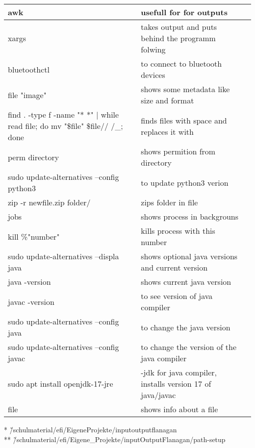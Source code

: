 \documentclass[12pt]{article}
\begin{document}
\begin{tabular}{| p{6.5cm} | p{6.5cm} | p{6.5cm} |}
    \hline
    awk & usefull for for outputs \\
    \hline 
    xargs & takes output and puts behind the programm folwing \\
    \hline
    bluetoothctl & to connect to bluetooth devices \\
    \hline
    file "image" & shows some metadata like size and format \\
    \hline
    find . -type f -name "* *" | while read file; do mv "\$file" \${file// /\_}; done & finds files with space and replaces it with \\
    \hline
    perm directory & shows permition from directory \\
    \hline
     sudo update-alternatives --config python3 & to update python3 verion\\
    \hline 
    zip -r newfile.zip folder/ & zips folder in file\\
    \hline
    jobs & shows process in backgrouns \\
    \hline 
    kill \%"number" & kills process with this number \\
    \hline
    sudo update-alternatives --displa java & shows optional java versions and current version\\
    \hline 
    java -version & shows current java version \\
    \hline
    javac -version & to see version of java compiler\\
    \hline 
    sudo update-alternatives --config java & to change the java version \\
    \hline
    sudo update-alternatives --config javac & to change the version of the java compiler\\
    \hline
    sudo apt install openjdk-17-jre & -jdk for java compiler, installs version 17 of java/javac \\
    \hline 
    file & shows info about a file \\
    \hline



\end{tabular}

* \~/schulmaterial/efi/EigeneProjekte/inputoutputflanagan \\
** \~/schulmaterial/efi/Eigene\_Projekte/inputOutputFlanagan/path-setup 
\end{document}

